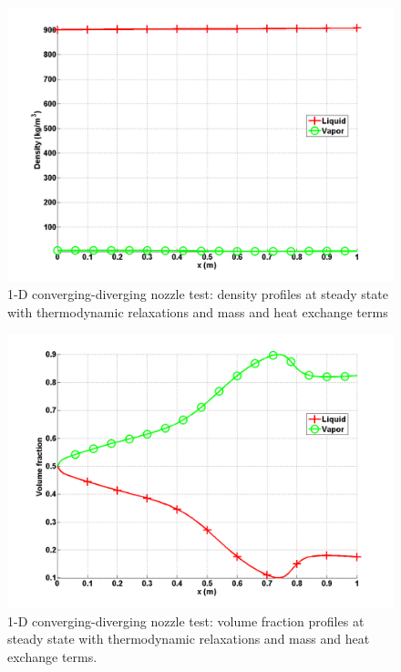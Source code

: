 %
\begin{figure}[H]
\centering
\includegraphics[width=\textwidth]{figures/SEM/Aint1e3MassOn_two_phases_density.png}
\caption{1-D converging-diverging nozzle test: density profiles at steady state with thermodynamic relaxations and mass and heat exchange terms}
\label{fig:two-fluids-rel-nozzle-rho-mass-on-sem-sect4}
\end{figure}
%
\begin{figure}[H]
\centering
\includegraphics[width=\textwidth]{figures/SEM/Aint1e3MassOn_two_phases_volume_fraction.png}
\caption{1-D converging-diverging nozzle test: volume fraction profiles at steady state with thermodynamic relaxations and mass and heat exchange terms.}
\label{fig:two-fluids-rel-nozzle-vf-mass-on-sem-sect4}
\end{figure}
